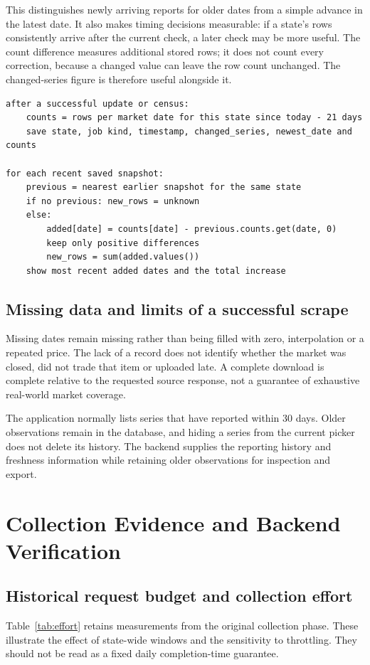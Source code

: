 \documentclass[12pt,a4paper,oneside]{report}
\numberwithin{equation}{chapter}
\numberwithin{figure}{chapter}
\numberwithin{table}{chapter}
\theoremstyle{definition}
\begin{document}
This distinguishes newly arriving reports for older dates from a simple advance in the latest date. It also makes timing decisions measurable: if a state's rows consistently arrive after the current check, a later check may be more useful. The count difference measures additional stored rows; it does not count every correction, because a changed value can leave the row count unchanged. The changed-series figure is therefore useful alongside it.

\begin{lstlisting}[caption={Algorithm: compare per-state arrival snapshots}]
after a successful update or census:
    counts = rows per market date for this state since today - 21 days
    save state, job kind, timestamp, changed_series, newest_date and counts

for each recent saved snapshot:
    previous = nearest earlier snapshot for the same state
    if no previous: new_rows = unknown
    else:
        added[date] = counts[date] - previous.counts.get(date, 0)
        keep only positive differences
        new_rows = sum(added.values())
    show most recent added dates and the total increase
\end{lstlisting}

\section{Missing data and limits of a successful scrape}
Missing dates remain missing rather than being filled with zero, interpolation or a repeated price. The lack of a record does not identify whether the market was closed, did not trade that item or uploaded late. A complete download is complete relative to the requested source response, not a guarantee of exhaustive real-world market coverage.

The application normally lists series that have reported within 30 days. Older observations remain in the database, and hiding a series from the current picker does not delete its history. The backend supplies the reporting history and freshness information while retaining older observations for inspection and export.

\chapter{Collection Evidence and Backend Verification}

\section{Historical request budget and collection effort}
\label{sec:perf}
Table~\ref{tab:effort} retains measurements from the original collection phase. These illustrate the effect of state-wide windows and the sensitivity to throttling. They should not be read as a fixed daily completion-time guarantee.
\end{document}
